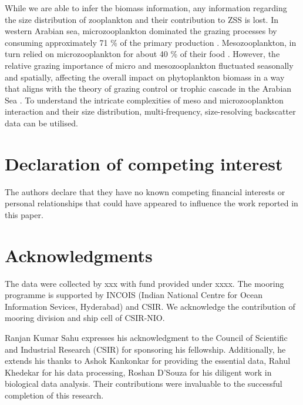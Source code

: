 \documentclass{article}
\begin{document}
	While we are able to infer the biomass information, any information regarding the size distribution of zooplankton and their contribution to ZSS is lost. In western Arabian sea, microzooplankton dominated the grazing processes by consuming approximately 71 \% of the primary production \citep{reckermann1997-kz,marra2005jgofs,landry2009-ti}. Mesozooplankton, in turn relied on microzooplankton for about 40 \% of their food \citep{landry2009-ti,hood2024nutrient}. However, the relative grazing importance of micro and mesozooplankton fluctuated seasonally and spatially, affecting the overall impact on phytoplankton biomass in a way that aligns with the theory of grazing control or trophic cascade \citep{ripple2016-nk} in the Arabian Sea \citep{marra2005jgofs,landry2009-ti}. To understand the intricate complexities of meso and microzooplankton interaction and their size distribution, multi-frequency, size-resolving backscatter data can be utilised.
	
	\section{Declaration of competing interest}
	The authors declare that they have no known competing financial interests or personal
	relationships that could have appeared to influence the work reported in this paper.
	
	\section{Acknowledgments} 
	The data were collected by xxx with fund provided under xxxx. The mooring programme is supported by INCOIS (Indian National Centre for Ocean Information Sevices, Hyderabad) and CSIR. We acknowledge the contribution of mooring division and ship cell of CSIR-NIO. 
	
	Ranjan Kumar Sahu expresses his acknowledgment to the Council of Scientific and Industrial Research (CSIR) for sponsoring his fellowship. Additionally, he extends his thanks to Ashok Kankonkar for providing the essential data, Rahul Khedekar for his data processing, Roshan D'Souza for his diligent work in biological data analysis. Their contributions were invaluable to the successful completion of this research.

\linespread{1.5}	
{\footnotesize 	 %
}	
\newpage
{} 
\end{document}
